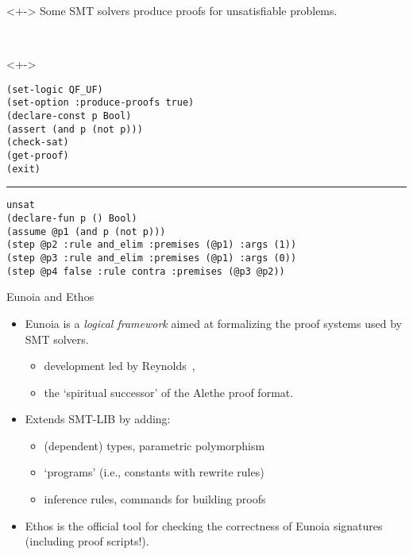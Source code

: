 \documentclass[lualatex, compress, 12pt]{beamer}
\begin{document}
\begin{frame}[fragile]
	\begin{uncoverenv}<+->
		Some SMT solvers produce \alert{proofs} for unsatisfiable problems.
	\end{uncoverenv}
	\\[3mm]
	\begin{uncoverenv}<+->
		\exxample
		\begin{lstlisting}[basicstyle=\ttfamily\footnotesize]
(set-logic QF_UF)
(set-option :produce-proofs true)
(declare-const p Bool)
(assert (and p (not p)))
(check-sat)
(get-proof)
(exit)\end{lstlisting}
		\hrule
		\begin{lstlisting}[basicstyle=\ttfamily\footnotesize]
unsat
(declare-fun p () Bool)
(assume @p1 (and p (not p)))
(step @p2 :rule and_elim :premises (@p1) :args (1))
(step @p3 :rule and_elim :premises (@p1) :args (0))
(step @p4 false :rule contra :premises (@p3 @p2))\end{lstlisting}
	\end{uncoverenv}
\end{frame}

\begin{frame}[fragile]{Eunoia and Ethos}
	\begin{itemize}
		\item<+->
		      \alert{Eunoia} is a \emph{logical framework} aimed at
		      formalizing the proof systems used by SMT solvers.
		      \begin{itemize}
			      \item<+-> development led by Reynolds~,
			      \item<+-> the `spiritual successor' of the \alert{Alethe} proof format.
		      \end{itemize}

		\item<+-> Extends SMT-LIB by adding:
		      \begin{itemize}
			      \item<+->(dependent) types, parametric polymorphism
			      \item<+->`programs' (i.e., constants with rewrite rules)
			      \item<+->inference rules, commands for building proofs
		      \end{itemize}

		\item<+->
		      \alert{Ethos} is the official tool for checking the correctness
		      of Eunoia signatures (including proof scripts!).
	\end{itemize}
\end{frame}
\end{document}
